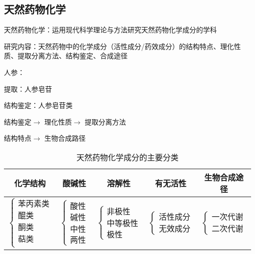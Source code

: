 \subsection{天然药物化学}%
\label{sub:天然药物化学}
\begin{defi}
    天然药物化学：运用现代科学理论与方法研究天然药物化学成分的学科
\end{defi}
研究内容：天然药物中的化学成分（活性成分/药效成分）的结构特点、理化性质、提取分离方法、结构鉴定、合成途径
\begin{eg}
    人参：

    提取：人参皂苷

    结构鉴定：人参皂苷类

    结构鉴定$\to$ 理化性质$\to$ 提取分离方法
    
    结构特点$\to$ 生物合成路径
\end{eg}
\begin{table}[htpb]
    \centering
    \caption{天然药物化学成分的主要分类}
    \label{tab:天然药物化学成分的主要分类}
    \begin{tabular}{ccccc}
    \toprule
    化学结构 & 酸碱性 & 溶解性 & 有无活性 & 生物合成途径\\
    \midrule
    $\begin{cases}
        \text{苯丙素类}\\ 
        \text{醌类}\\ 
        \text{酮类}\\ 
        \text{萜类}\\ 
    \end{cases}$ & $\begin{cases}
        \text{酸性}\\ 
        \text{碱性}\\ 
        \text{中性}\\ 
        \text{两性}
    \end{cases}$ & $\begin{cases}
        \text{非极性}\\ 
        \text{中等极性}\\ 
        \text{极性}
    \end{cases}$ & $\begin{cases}
        \text{活性成分}\\ 
        \text{无效成分}
    \end{cases}$ & $\begin{cases}
        \text{一次代谢}\\ 
        \text{二次代谢}
    \end{cases}$ \\
    \bottomrule
    \end{tabular}
\end{table}
